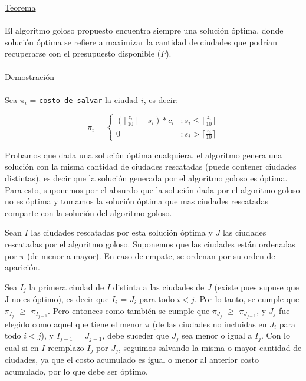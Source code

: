 \underline{Teorema}
\\
\\
El algoritmo goloso propuesto encuentra siempre una solución óptima, donde solución óptima se refiere a maximizar la cantidad de ciudades que podrían recuperarse con el presupuesto disponible ($P$).
\\
\\
\underline{Demostración}
\\
\\
Sea $\pi_{i}$ = \texttt{costo de salvar} la ciudad $i$, es decir:

\begin{displaymath}
   \pi_{i} = \left\{
     \begin{array}{lr}
       (\lceil \frac{z_{i}}{10} \rceil - s_{i}) * c_{i} & : s_{i} \leq \lceil \frac{z_{i}}{10}\rceil \\
       0 & : s_{i} > \lceil \frac{z_{i}}{10}\rceil 
     \end{array}
   \right.
\end{displaymath}


Probamos que dada una solución óptima cualquiera, el algoritmo genera una solución con la misma cantidad de ciudades rescatadas (puede contener ciudades distintas), es decir que la solución generada por el algoritmo goloso es óptima.
Para esto, suponemos por el absurdo que la solución dada por el algoritmo goloso no es óptima y
tomamos la solución óptima que mas ciudades rescatadas comparte con la solución del algoritmo goloso.

Sean $I$ las ciudades rescatadas por esta solución óptima y $J$ las ciudades rescatadas por el algoritmo goloso.
Suponemos que las ciudades están ordenadas por $\pi$ (de menor a mayor). En caso de empate, se ordenan por su orden de aparición.

Sea $I_{j}$ la primera ciudad de $I$ distinta a las ciudades de $J$ (existe pues supuse  que J no es óptimo), es decir que $I_{i}$ = $J_{i}$ para todo $i < j$. Por lo tanto, se cumple que $\pi_{I_{j}}$ $\geq$ $\pi_{I_{j - 1}}$. Pero entonces como también se cumple que $\pi_{J_{j}}$ $\geq$ $\pi_{J_{j - 1}}$, y $J_{j}$ fue elegido como aquel que tiene el menor $\pi$ (de las ciudades no incluidas en $J_{i}$ para todo $i < j$), y $I_{j - 1}$ = $J_{j - 1}$, debe suceder que $J_{j}$ sea menor o igual a $I_{j}$. Con lo cual si en $I$ reemplazo $I_{j}$ por $J_{j}$, seguimos salvando la misma o mayor cantidad de ciudades, ya que el costo acumulado es igual o menor al anterior costo acumulado, por lo que debe ser óptimo.

